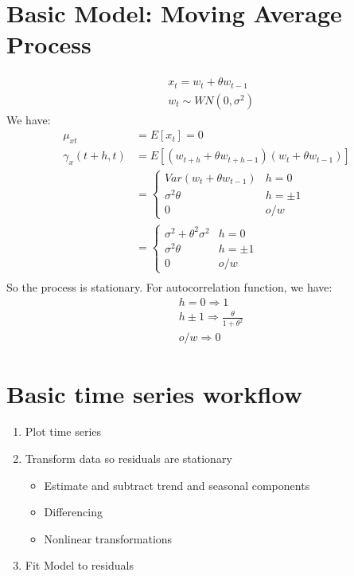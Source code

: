 \section{Basic Model: Moving Average Process}
    \begin{align*}
        & x_t = w_t + \theta w_{t-1} \\
        & w_t \sim WN(0, \sigma^2)
    \end{align*}
We have: 
    \begin{align*}
        \mu_{xt} & = E[x_t] = 0 \\
        \gamma_x(t+h, t) & = E[(w_{t+h}+\theta w_{t+h-1})(w_t + \theta w_{t-1})] \\
                        & = \begin{cases}
                            Var(w_{t}+\theta w_{t-1}) & h = 0 \\
                            \sigma^2\theta & h = \pm 1 \\
                            0 & o/w
                        \end{cases}\\
                        & = \begin{cases}
                            \sigma^2 + \theta^2 \sigma^2 & h = 0 \\
                            \sigma^2\theta & h = \pm 1 \\
                            0 & o/w
                        \end{cases}\\
    \end{align*}
So the process is stationary. For autocorrelation function, we have: 
    \begin{align*}
        & h=0 \Longrightarrow 1\\
        & h \pm 1 \Longrightarrow \frac{\theta}{1+\theta^2}\\
        & o/w \Longrightarrow 0
    \end{align*}


\section{Basic time series workflow}
\begin{enumerate}
    \item Plot time series
    \item Transform data so residuals are stationary 
        \begin{itemize}
            \item Estimate and subtract trend and seasonal components
            \item Differencing 
            \item Nonlinear transformations
        \end{itemize}
    \item Fit Model to residuals 
\end{enumerate}


